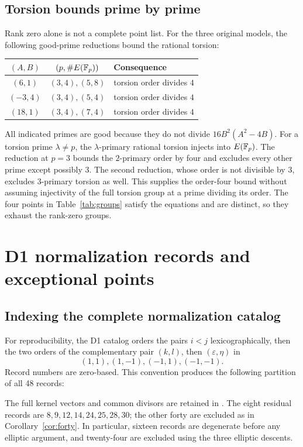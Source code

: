 \subsection{Torsion bounds prime by prime}
Rank zero alone is not a complete point list. For the three original models, the following good-prime reductions bound the rational torsion:
\begin{center}\small
\begin{tabular}{ccl}
\toprule
$(A,B)$ & $(p,\#E(\mathbb F_p))$ & Consequence\\
\midrule
$(6,1)$ & $(3,4),(5,8)$ & torsion order divides $4$\\
$(-3,4)$ & $(3,4),(5,4)$ & torsion order divides $4$\\
$(18,1)$ & $(3,4),(7,4)$ & torsion order divides $4$\\
\bottomrule
\end{tabular}
\end{center}
All indicated primes are good because they do not divide $16B^2(A^2-4B)$. For a torsion prime $\lambda\ne p$, the $\lambda$-primary rational torsion injects into $E(\mathbb F_p)$. The reduction at $p=3$ bounds the $2$-primary order by four and excludes every other prime except possibly $3$. The second reduction, whose order is not divisible by $3$, excludes $3$-primary torsion as well. This supplies the order-four bound without assuming injectivity of the full torsion group at a prime dividing its order. The four points in Table~\ref{tab:groups} satisfy the equations and are distinct, so they exhaust the rank-zero groups.

\section{D1 normalization records and exceptional points}\label{app:d1checks}
\subsection{Indexing the complete normalization catalog}
For reproducibility, the D1 catalog orders the pairs $i<j$ lexicographically, then the two orders of the complementary pair $(k,l)$, then $(\varepsilon,\eta)$ in
\[
 (1,1),(1,-1),(-1,1),(-1,-1).
\]
Record numbers are zero-based. This convention produces the following partition of all 48 records:

The full kernel vectors and common divisors are retained in . The eight residual records are $8,9,12,14,24,25,28,30$; the other forty are excluded as in Corollary~\ref{cor:forty}. In particular, sixteen records are degenerate before any elliptic argument, and twenty-four are excluded using the three elliptic descents.

